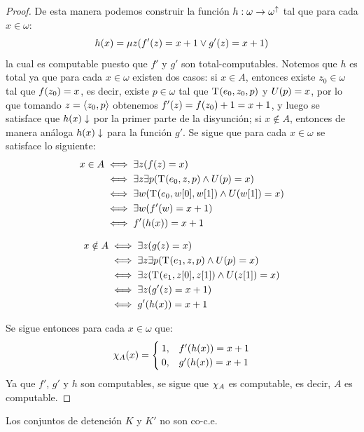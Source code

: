 \begin{proof}
	De esta manera podemos construir la función $h:\omega\to\omega^{\DIVERGE}$ tal que para cada $x\in\omega$:
	\[
		h\pa*{x} =\mu z\pa*{f'\pa*{z} = x + 1\lor g'\pa*{z} = x + 1}
	\]
	la cual es computable puesto que $f'$ y $g'$ son total-computables. Notemos que $h$ es total ya que para cada $x\in\omega$ existen dos casos: si $x\in A$, entonces existe $z_{0}\in\omega$ tal que $f\pa*{z_{0}} = x$, es decir, existe $p\in\omega$ tal que $\KLEENE\pa*{e_{0}, z_{0}, p}$ y $U\pa*{p} = x$, por lo que tomando $z =\inner*{z_{0}, p}$ obtenemos $f'\pa*{z} = f\pa*{z_{0}} + 1 = x + 1$, y luego se satisface que $h\pa*{x}\ACABA$ por la primer parte de la disyunción; si $x\notin A$, entonces de manera análoga $h\pa*{x}\ACABA$ para la función $g'$. Se sigue que para cada $x\in\omega$ se satisface lo siguiente:
	\begin{align*}
		x\in A&\iff\exists z\pa*{f\pa*{z} = x}\\
		&\iff\exists z\exists p\pa*{\KLEENE\pa*{e_{0}, z, p}\land U\pa*{p} = x}\\
		&\iff\exists w\pa*{\KLEENE\pa*{e_{0}, w\bra*{0}, w\bra*{1}}\land U\pa*{w\bra*{1}} = x}\\
		&\iff\exists w\pa*{f'\pa*{w} = x + 1}\\
		&\iff f'\pa*{h\pa*{x}} = x + 1
	\end{align*}

	\begin{align*}
		x\notin A&\iff\exists z\pa*{g\pa*{z} = x}\\
		&\iff\exists z\exists p\pa*{\KLEENE\pa*{e_{1}, z, p}\land U\pa*{p} = x}\\
		&\iff\exists z\pa*{\KLEENE\pa*{e_{1}, z\bra*{0}, z\bra*{1}}\land U\pa*{z\bra*{1}} = x}\\
		&\iff\exists z\pa*{g'\pa*{z} = x + 1}\\
		&\iff g'\pa*{h\pa*{x}} = x + 1
	\end{align*}

	Se sigue entonces para cada $x\in\omega$ que:
	\[
		\CARACTERISTICA{A}\pa*{x} =
		\begin{cases}
			1, & f'\pa*{h\pa*{x}} = x + 1\\
			0, & g'\pa*{h\pa*{x}} = x + 1
		\end{cases}
	\]
	Ya que $f'$, $g'$ y $h$ son computables, se sigue que $\CARACTERISTICA{A}$ es computable, es decir, $A$ es computable.
\end{proof}

\begin{coll}
	Los conjuntos de detención $K$ y $K'$ no son co-c.e.
\end{coll}

